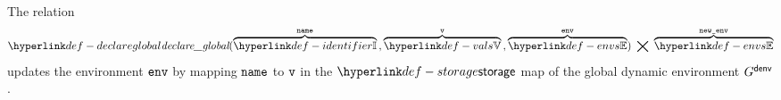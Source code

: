 \ProseParagraph
The relation
\hypertarget{def-declareglobal}{}
\[
  \declareglobal(\overname{\Identifiers}{\name} \aslsep \overname{\vals}{\vv} \aslsep \overname{\envs}{\env}) \;\aslrel\; \overname{\envs}{\newenv}
\]
updates the environment $\env$ by mapping $\name$ to $\vv$ in the $\storage$ map of the global dynamic environment $G^\denv$.

\FormallyParagraph
\begin{mathpar}
\end{mathpar}
